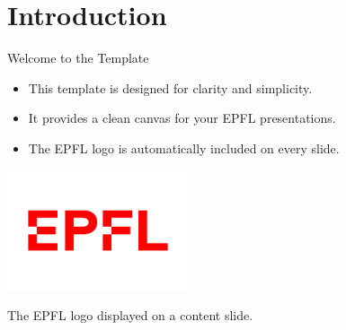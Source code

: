 \section{Introduction}
\begin{frame}{Welcome to the Template}
    \begin{itemize}
        \item This template is designed for clarity and simplicity.
        \item It provides a clean canvas for your EPFL presentations.
        \item The EPFL logo is automatically included on every slide.
    \end{itemize}
    \centering
    \includegraphics[width=0.4\textwidth]{figures/epfl.png} %
    \par\small The EPFL logo displayed on a content slide.
\end{frame}
